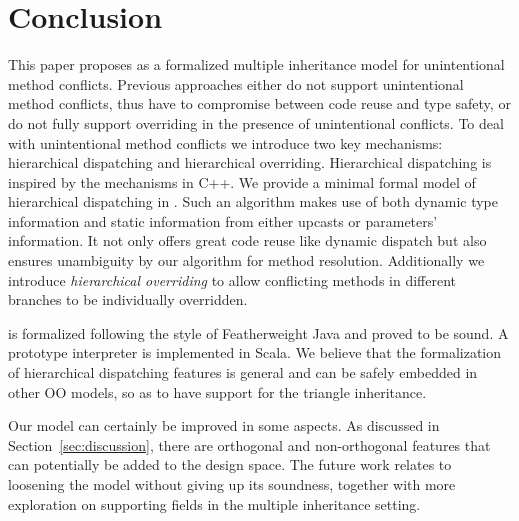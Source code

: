 \section{Conclusion}


This paper proposes \MIM{} as a formalized multiple inheritance model for
unintentional method conflicts. Previous approaches 
either do not support unintentional method conflicts, thus have to
compromise between code reuse and type safety, or do not fully support
overriding in the presence of unintentional conflicts. To deal with unintentional method conflicts we
introduce two key mechanisms: hierarchical dispatching and
hierarchical overriding. Hierarchical dispatching is inspired by the
mechanisms in C++. We provide a minimal formal model of hierarchical
dispatching in \MIM{}. Such an algorithm makes use of both dynamic type
information and static information from either upcasts or parameters'
information. It not only offers great code reuse like
dynamic dispatch but also ensures unambiguity by our algorithm for
method resolution. Additionally we introduce \emph{hierarchical
  overriding} to allow conflicting methods in different branches to be
individually overridden.

\MIM{} is formalized following the style of
Featherweight Java and proved to be sound. A prototype interpreter is
implemented in Scala. We believe that the formalization of
hierarchical dispatching features is general and
can be safely embedded in other OO models, so as to have support for the triangle
inheritance.

Our model can certainly be improved in some aspects. 
As discussed in Section~\ref{sec:discussion}, there are orthogonal and
non-orthogonal features that can potentially be added to the design space. 
The future work relates to loosening the model without giving up its soundness,
together with more exploration on supporting fields in the multiple inheritance setting.
